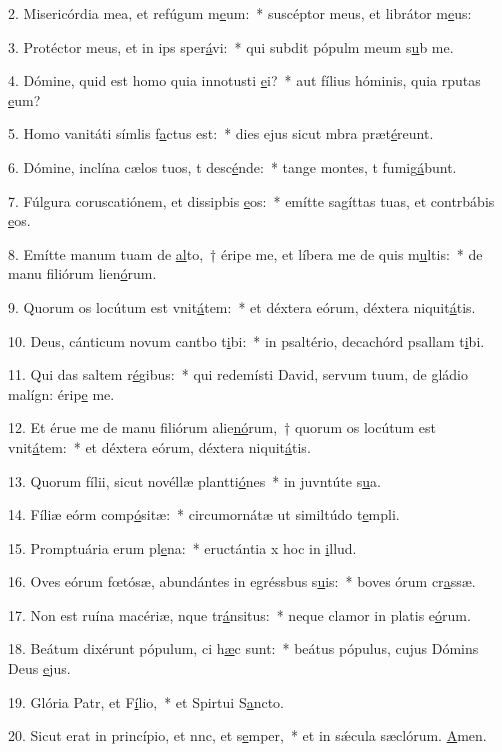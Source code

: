 2. Misericórdia mea, et refúgum m\uline{e}um:~* suscéptor meus, et librátor m\uline{e}us:\par 
3. Protéctor meus, et in ips sper\uline{á}vi:~* qui subdit pópulm meum s\uline{u}b me.\par 
4. Dómine, quid est homo quia innotusti \uline{e}i?~* aut fílius hóminis, quia rputas \uline{e}um?\par 
5. Homo vanitáti símlis f\uline{a}ctus est:~* dies ejus sicut mbra præt\uline{é}reunt.\par 
6. Dómine, inclína cælos tuos, t desc\uline{é}nde:~* tange montes, t fumig\uline{á}bunt.\par 
7. Fúlgura coruscatiónem, et dissipbis \uline{e}os:~* emítte sagíttas tuas, et contrbábis \uline{e}os.\par 
8. Emítte manum tuam de \uline{al}to,~† éripe me, et líbera me de quis m\uline{u}ltis:~* de manu filiórum lien\uline{ó}rum.\par 
9. Quorum os locútum est vnit\uline{á}tem:~* et déxtera eórum, déxtera niquit\uline{á}tis.\par 
10. Deus, cánticum novum cantbo t\uline{i}bi:~* in psaltério, decachórd psallam t\uline{i}bi.\par 
11. Qui das saltem r\uline{é}gibus:~* qui redemísti David, servum tuum, de gládio malígn: érip\uline{e} me.\par 
12. Et érue me de manu filiórum alie\uline{nó}rum,~† quorum os locútum est vnit\uline{á}tem:~* et déxtera eórum, déxtera niquit\uline{á}tis.\par 
13. Quorum fílii, sicut novéllæ plantti\uline{ó}nes~* in juvntúte s\uline{u}a.\par 
14. Fíliæ eórm comp\uline{ó}sitæ:~* circumornátæ ut similtúdo t\uline{e}mpli.\par 
15. Promptuária erum pl\uline{e}na:~* eructántia x hoc in \uline{i}llud.\par 
16. Oves eórum fœtósæ, abundántes in egréssbus s\uline{u}is:~* boves órum cr\uline{a}ssæ.\par 
17. Non est ruína macériæ, nque tr\uline{á}nsitus:~* neque clamor in platis e\uline{ó}rum.\par 
18. Beátum dixérunt pópulum, ci h\uline{æ}c sunt:~* beátus pópulus, cujus Dómins Deus \uline{e}jus.\par 
19. Glória Patr, et F\uline{í}lio,~* et Spirtui S\uline{a}ncto.\par 
20. Sicut erat in princípio, et nnc, et s\uline{e}mper,~* et in sǽcula sæclórum. \uline{A}men.\par 

